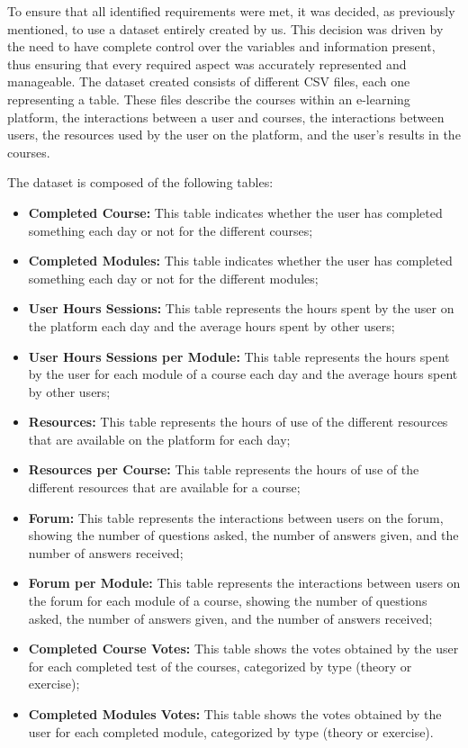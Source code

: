 To ensure that all identified requirements were met, it was decided, 
as previously mentioned, to use a dataset entirely created by us. This decision was driven by the need to have 
complete control over the variables and information present, thus ensuring that every required aspect was 
accurately represented and manageable. The dataset created consists of different CSV files, each one representing a table. 
These files describe the courses within an e-learning platform, the interactions between a user and courses,
the interactions between users, the resources used by the user on the platform, and the user's
results in the courses.


The dataset is composed of the following tables:
\begin{itemize}
    \item 
        \textbf{Completed Course:} This table indicates whether the user has completed something each 
        day or not for the different courses;
    \item 
        \textbf{Completed Modules:} This table indicates whether the user has completed something each 
        day or not for the different modules;
    \item 
        \textbf{User Hours Sessions:} This table represents the hours spent by the user on the platform 
        each day and the average hours spent by other users;
    \item 
        \textbf{User Hours Sessions per Module:} This table represents the hours spent by the user for each module
        of a course each day and the average hours spent by other users;
    \item 
        \textbf{Resources:} This table represents the hours of use of the different resources that are
        available on the platform for each day;
    \item 
        \textbf{Resources per Course:} This table represents the hours of use of the different resources that are
        available for a course;
    \item 
        \textbf{Forum:} This table represents the interactions between users on the forum, showing the number
        of questions asked, the number of answers given, and the number of answers received;
    \item 
        \textbf{Forum per Module:} This table represents the interactions between users on the forum for each module of a course, showing the number
        of questions asked, the number of answers given, and the number of answers received;
    \item 
        \textbf{Completed Course Votes:} This table shows the votes obtained by the user for each completed test of the courses, 
        categorized by type (theory or exercise);
    \item 
        \textbf{Completed Modules Votes:} This table shows the votes obtained by the user for each completed module, 
        categorized by type (theory or exercise).
\end{itemize}
